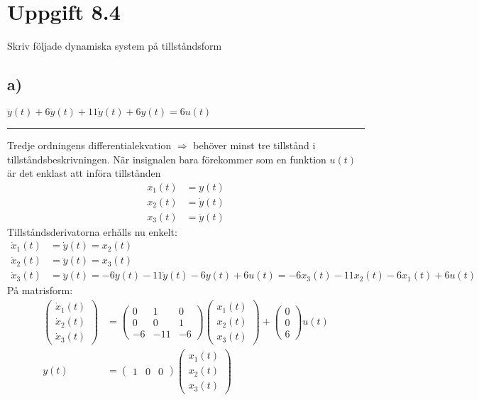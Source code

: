 \documentclass[12pt]{article}
\newcommand{\qline}{\hrule \vspace*{10pt}}
\begin{document}
\section*{Uppgift 8.4}
Skriv följade dynamiska system på tillståndsform

\subsection*{a)}
$\dddot{y}(t) + 6\ddot{y}(t) + 11 \dot{y}(t) + 6y(t) = 6u(t)$
\qline
Tredje ordningens differentialekvation $\Rightarrow$ behöver minst tre tillstånd i tillståndsbeskrivningen. När insignalen bara förekommer som en funktion $u(t)$ är det enklast att införa tillstånden
\begin{align*}
  x_1(t) &= y(t) \\
  x_2(t) &= \dot{y}(t) \\
  x_3(t) &= \ddot{y}(t)
\end{align*}
Tillståndsderivatorna erhålls nu enkelt:
\begin{align*}
  \dot{x}_1(t) &= \dot{y}(t) = x_2(t) \\
  \dot{x}_2(t) &= \ddot{y}(t) = x_3(t) \\
  \dot{x}_3(t) &= \dddot{y}(t) = -6\ddot{y}(t) - 11\dot{y}(t) - 6y(t) + 6u(t) = -6x_3(t)-11x_2(t)-6x_1(t) + 6u(t)
\end{align*}
På matrisform:
\begin{align*}
  \begin{pmatrix}
    \dot{x}_1(t) \\
    \dot{x}_2(t) \\
    \dot{x}_3(t)
  \end{pmatrix} &=
  \begin{pmatrix}
    0 & 1 & 0 \\
    0 & 0 & 1 \\
    -6 & -11 & -6
  \end{pmatrix}
               \begin{pmatrix}
                 x_1(t) \\
                 x_2(t) \\
                 x_3(t)
               \end{pmatrix}
+
  \begin{pmatrix}
    0 \\
    0 \\
    6
  \end{pmatrix}u(t) \\
y(t) &=
       \begin{pmatrix}
         1 & 0 & 0
       \end{pmatrix}
                 \begin{pmatrix}
                   x_1(t) \\
                   x_2(t) \\
                   x_3(t)
                 \end{pmatrix}
\end{align*}
\end{document}
